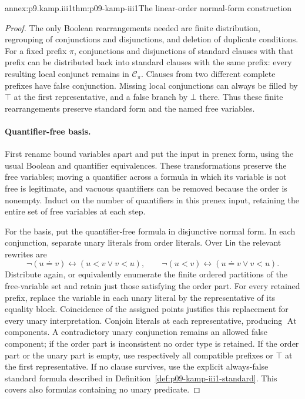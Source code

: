 \begin{annexitem}{annex:p9.kamp.iii1}{thm:p09-kamp-iii1}{The linear-order normal-form construction}
\begin{proof}
The only Boolean rearrangements needed are finite distribution, regrouping
of conjunctions and disjunctions, and deletion of duplicate conditions.
For a fixed prefix \(\pi\), conjunctions and disjunctions of standard
clauses with that prefix can be distributed back into standard clauses with
the same prefix: every resulting local conjunct remains in
\(\mathcal C_\pi\).  Clauses from two different complete prefixes have
false conjunction.  Missing local conjunctions can always be filled by
\(\top\) at the first representative, and a false branch by \(\bot\)
there.  Thus these finite rearrangements preserve standard form and the
named free variables.

\paragraph{Quantifier-free basis.}
First rename bound variables apart and put the input in prenex form, using
the usual Boolean and quantifier equivalences.  These transformations
preserve the free variables; moving a quantifier across a formula in which
its variable is not free is legitimate, and vacuous quantifiers can be
removed because the order is nonempty.  Induct on the number of quantifiers
in this prenex input, retaining the entire set of free variables at each
step.

For the basis, put the quantifier-free formula in disjunctive normal form.
In each conjunction, separate unary literals from order literals.  Over
\(\mathsf{Lin}\) the relevant rewrites are
\[
 \neg(u\doteq v)\longleftrightarrow(u<v\lor v<u),\qquad
 \neg(u<v)\longleftrightarrow(u\doteq v\lor v<u).
\]
Distribute again, or equivalently enumerate the finite ordered partitions
of the free-variable set and retain just those satisfying the order part.
For every retained prefix, replace the variable in each unary literal by
the representative of its equality block.  Coincidence of the assigned
points justifies this replacement for every unary interpretation.
Conjoin literals at each representative, producing
\(\operatorname{At}\) components.  A contradictory unary conjunction
remains an allowed false component; if the order part is inconsistent no
order type is retained.  If the order part or the unary part is empty, use
respectively all compatible prefixes or \(\top\) at the first
representative.  If no clause survives, use the explicit always-false
standard formula described in Definition~\ref{def:p09-kamp-iii1-standard}.
This covers also formulas containing no unary predicate.


\end{proof}
\end{annexitem}
